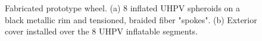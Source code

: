 \documentclass{article}
\begin{document}
\begin{figure}[hbt!]
    \centering
    \begin{minipage}{0.35\textwidth}
        \centering
    \end{minipage}
    \begin{minipage}{0.6\textwidth}
        \centering
    \end{minipage}
    \caption{Fabricated prototype wheel. (a) 8 inflated UHPV spheroids on a black metallic rim and tensioned, braided fiber "spokes". (b) Exterior cover installed over the 8 UHPV inflatable segments.}
    \label{tire_prototype}
\end{figure}
\end{document}
